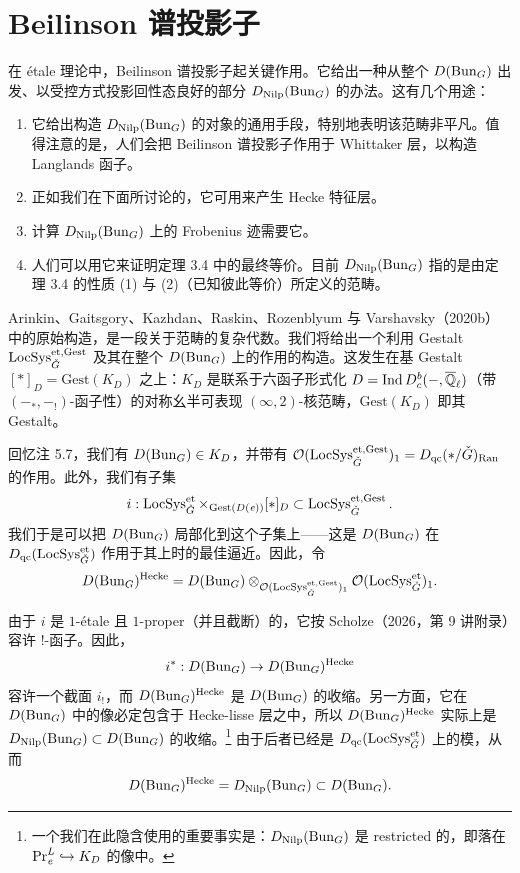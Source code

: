 \section{Beilinson 谱投影子}

在 étale 理论中，Beilinson 谱投影子起关键作用。它给出一种从整个 $D(\operatorname{Bun}_G)$ 出发、以受控方式投影回性态良好的部分 $D_{\mathrm{Nilp}}(\operatorname{Bun}_G)$ 的办法。这有几个用途：

\begin{enumerate}
\item 它给出构造 $D_{\mathrm{Nilp}}(\operatorname{Bun}_G)$ 的对象的通用手段，特别地表明该范畴非平凡。值得注意的是，人们会把 Beilinson 谱投影子作用于 Whittaker 层，以构造 Langlands 函子。
\item 正如我们在下面所讨论的，它可用来产生 Hecke 特征层。
\item 计算 $D_{\mathrm{Nilp}}(\operatorname{Bun}_G)$ 上的 Frobenius 迹需要它。
\item 人们可以用它来证明定理 3.4 中的最终等价。目前 $D_{\mathrm{Nilp}}(\operatorname{Bun}_G)$ 指的是由定理 3.4 的性质 (1) 与 (2)（已知彼此等价）所定义的范畴。
\end{enumerate}

Arinkin、Gaitsgory、Kazhdan、Raskin、Rozenblyum 与 Varshavsky（2020b）中的原始构造，是一段关于范畴的复杂代数。我们将给出一个利用 Gestalt $\operatorname{LocSys}^{\mathrm{et},\mathrm{Gest}}_{\check{G}}$ 及其在整个 $D(\operatorname{Bun}_G)$ 上的作用的构造。这发生在基 Gestalt $[*]_D=\mathrm{Gest}(K_D)$ 之上：$K_D$ 是联系于六函子形式化 $D=\operatorname{Ind} D^{b}_{c}(-,\overline{\mathbb{Q}}_{\ell})$（带 $(-_{*},-_{!})$-函子性）的对称幺半可表现 $(\infty,2)$-核范畴，$\mathrm{Gest}(K_D)$ 即其 Gestalt。

回忆注 5.7，我们有 $D(\operatorname{Bun}_G)\in K_D$，并带有 $\mathcal{O}(\operatorname{LocSys}^{\mathrm{et},\mathrm{Gest}}_{\check{G}})_{1}=D_{\mathrm{qc}}(*/\check{G})_{\mathrm{Ran}}$ 的作用。此外，我们有子集
\[ i:\operatorname{LocSys}^{\mathrm{et}}_{\check{G}}\times_{\mathrm{Gest}(D(\mathit{e}))}[*]_D\subset\operatorname{LocSys}^{\mathrm{et},\mathrm{Gest}}_{\check{G}}. \]
我们于是可以把 $D(\operatorname{Bun}_G)$ 局部化到这个子集上——这是 $D(\operatorname{Bun}_G)$ 在 $D_{\mathrm{qc}}(\operatorname{LocSys}^{\mathrm{et}}_{\check{G}})$ 作用于其上时的最佳逼近。因此，令
\[ D(\operatorname{Bun}_G)^{\mathrm{Hecke}}=D(\operatorname{Bun}_G)\otimes_{\mathcal{O}(\operatorname{LocSys}^{\mathrm{et},\mathrm{Gest}}_{\check{G}})_{1}}\mathcal{O}(\operatorname{LocSys}^{\mathrm{et}}_{\check{G}})_{1}. \]

由于 $i$ 是 $1$-étale 且 $1$-proper（并且截断）的，它按 Scholze（2026，第 9 讲附录）容许 $!$-函子。因此，
\[ i^{*}:D(\operatorname{Bun}_G)\to D(\operatorname{Bun}_G)^{\mathrm{Hecke}} \]
容许一个截面 $i_{!}$，而 $D(\operatorname{Bun}_G)^{\mathrm{Hecke}}$ 是 $D(\operatorname{Bun}_G)$ 的收缩。另一方面，它在 $D(\operatorname{Bun}_G)$ 中的像必定包含于 Hecke-lisse 层之中，所以 $D(\operatorname{Bun}_G)^{\mathrm{Hecke}}$ 实际上是 $D_{\mathrm{Nilp}}(\operatorname{Bun}_G)\subset D(\operatorname{Bun}_G)$ 的收缩。\footnote{一个我们在此隐含使用的重要事实是：$D_{\mathrm{Nilp}}(\operatorname{Bun}_G)$ 是 restricted 的，即落在 $\mathrm{Pr}^{L}_{\mathit{e}}\hookrightarrow K_D$ 的像中。} 由于后者已经是 $D_{\mathrm{qc}}(\operatorname{LocSys}^{\mathrm{et}}_{\check{G}})$ 上的模，从而
\[ D(\operatorname{Bun}_G)^{\mathrm{Hecke}}=D_{\mathrm{Nilp}}(\operatorname{Bun}_G)\subset D(\operatorname{Bun}_G). \]

